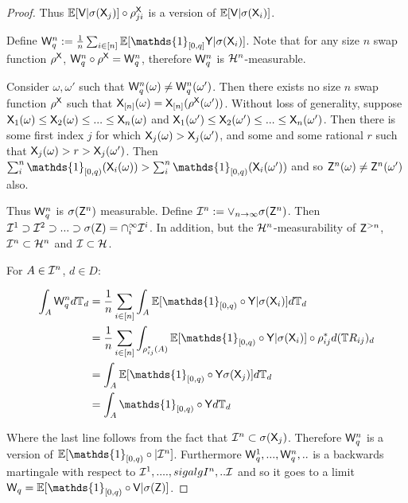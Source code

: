 \begin{proof}
Thus $\mathbb{E}[\mathsf{V}|\sigma(\mathsf{X}_j)]\circ\rho^{\mathsf{X}}_{ji}$ is a version of $\mathbb{E}[\mathsf{V}|\sigma({\mathsf{X}_i})]$.

Define $\RV{W}^n_q := \frac{1}{n}\sum_{i\in [n]} \mathbb{E}[\mathds{1}_{[0,q]}\RV{Y}|\sigma(\RV{X}_i)]$. Note that for any size $n$ swap function $\rho^{\mathsf{X}}$, $\mathsf{W}^n_q\circ\rho^{\mathsf{X}}=\mathsf{W}_q^n$, therefore $\mathsf{W}_q^n$ is $\mathcal{H}^n$-measurable. 

Consider $\omega,\omega'$ such that $\mathsf{W}_q^n(\omega)\neq \mathsf{W}_q^n(\omega')$. Then there exists no size $n$ swap function $\rho^{\mathsf{X}}$ such that $\mathsf{X}_{[n]}(\omega)=\mathsf{X}_{[n]}(\rho^{\mathsf{X}}(\omega'))$. Without loss of generality, suppose $\mathsf{X}_1(\omega)\leq\mathsf{X}_2(\omega)\leq...\leq\mathsf{X}_n(\omega)$ and $\mathsf{X}_1(\omega')\leq\mathsf{X}_2(\omega')\leq...\leq\mathsf{X}_n(\omega')$. Then there is some first index $j$ for which $\mathsf{X}_{j}(\omega)> \mathsf{X}_{j}(\omega')$, and some and some rational $r$ such that $\mathsf{X}_j(\omega)>r>\mathsf{X}_j(\omega')$. Then $\sum_{i}^n \mathds{1}_{[0,q)}(\RV{X}_i(\omega)) > \sum_i^n \mathds{1}_{[0,q)}(\RV{X}_i(\omega'))$ and so $\mathsf{Z}^n(\omega)\neq\mathsf{Z}^n(\omega')$ also.

Thus $\mathsf{W}_q^n$ is $\sigma(\mathsf{Z}^n)$ measurable. Define $\mathcal{I}^n:=\vee_{n\to\infty} \sigma(\mathsf{Z}^n)$. Then $\mathcal{I}^1\supset\mathcal{I}^2\supset...\supset\sigma(\mathsf{Z})=\cap_{i}^\infty \mathcal{I}^i$. In addition, but the $\mathcal{H}^n$-measurability of $\mathsf{Z}^{>n}$, $\mathcal{I}^n\subset\mathcal{H}^n$ and $\mathcal{I}\subset\mathcal{H}$.

For $A\in\mathcal{I}^n$, $d\in D$:

\begin{align}
    \int_A \RV{W}_q^n d\kernel{T}_d &= \frac{1}{n}\sum_{i\in[n]} \int_A \mathbb{E}[\mathds{1}_{[0,q)}\circ\RV{Y}|\sigma(\RV{X}_i)] d\kernel{T}_d\\
                                  &= \frac{1}{n}\sum_{i\in[n]} \int_{\rho_{ij}^*(A)} \mathbb{E}[\mathds{1}_{[0,q)}\circ\RV{Y}|\sigma(\RV{X}_i)]\circ\rho_{ij}^*d(\kernel{T}R_{ij})_d\\
                                  &= \int_{A} \mathbb{E}[\mathds{1}_{[0,q)}\circ \RV{Y} \sigma(\RV{X}_j)]d\kernel{T}_d\\
                                  &= \int_{A} \mathds{1}_{[0,q)}\circ \RV{Y} d\kernel{T}_d
\end{align}

Where the last line follows from the fact that $\mathcal{I}^n\subset \sigma(\mathsf{X}_j)$. Therefore $\mathsf{W}^n_q$ is a version of $\mathbb{E}[\mathds{1}_{[0,q)}\circ|\sigalg{I}^n]$. Furthermore $\mathsf{W}^1_q,...,\mathsf{W}^n_q,..$ is a backwards martingale with respect to $\mathcal{I}^1,....,sigalg{I}^n,..\mathcal{I}$ and so it goes to a limit $\RV{W}_q=\mathbb{E}[\mathds{1}_{[0,q)}\circ \RV{V} |\sigma(\RV{Z})]$.


\end{proof}
